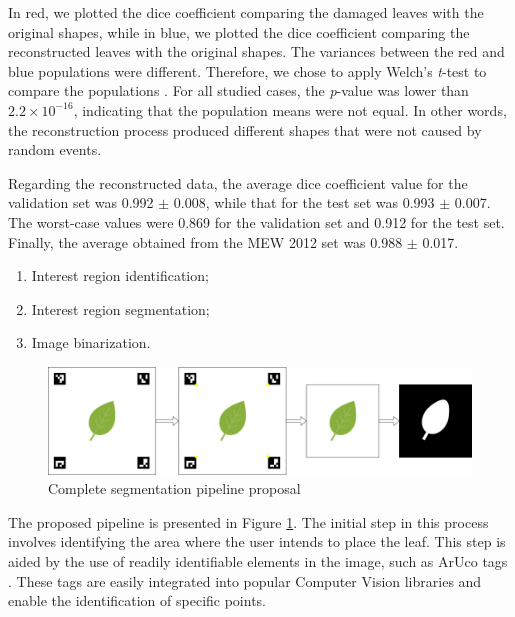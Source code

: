 In red, we plotted the dice coefficient comparing the damaged leaves with the original shapes, while in blue, we plotted the dice coefficient comparing the reconstructed leaves with the original shapes. The variances between the red and blue populations were different. Therefore, we chose to apply Welch's \textit{t}-test to compare the populations \cite{salkind2010encyclopedia}. For all studied cases, the \textit{p}-value was lower than $2.2 \times 10^{-16}$, indicating that the population means were not equal. In other words, the reconstruction process produced different shapes that were not caused by random events.

Regarding the reconstructed data, the average dice coefficient value for the validation set was 0.992 $\pm$ 0.008, while that for the test set was 0.993 $\pm$ 0.007. The worst-case values were 0.869 for the validation set and 0.912 for the test set. Finally, the average obtained from the MEW 2012 set was 0.988 $\pm$ 0.017.

\begin{enumerate}
    \item Interest region identification;
    \item Interest region segmentation;
    \item Image binarization.
\end{enumerate}

\begin{figure}[h!]
    \centering
    \includegraphics[width = \linewidth]{Figures/full-pipeline.png}
    \caption{Complete segmentation pipeline proposal}
    \label{fig:pipeline-proposal}
\end{figure}

The proposed pipeline is presented in Figure \ref{fig:pipeline-proposal}. The initial step in this process involves identifying the area where the user intends to place the leaf. This step is aided by the use of readily identifiable elements in the image, such as ArUco tags \cite{garrido2014automatic}. These tags are easily integrated into popular Computer Vision libraries and enable the identification of specific points. 

